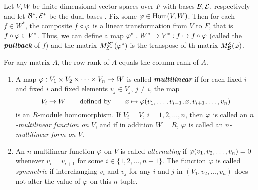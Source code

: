 \nl

\begin{thm}
Let $V,W$ be finite dimensional vector spaces over $F$ with bases $\mathcal{B}, \mathcal{E}$, respectively and let $\mathcal{B}^*,\mathcal{E}^*$ be the dual bases . Fix some $\varphi\in \text{Hom}(V,W)$. Then for each $f\in W^*$, the composite $f\circ \varphi$ is a linear transformation from $V$ to $F$, that is $f\circ \varphi\in V^*$. Thus, we can define a map $\varphi^*:W^* \rightarrow V^*:f\mapsto f\circ \varphi$ (called the \textit{\textbf{pullback}} of $f$) and the matrix $M_{\mathcal{E}^*}^{\mathcal{B}^*}(\varphi^*)$ is the transpose of th matrix $M_{\mathcal{B}}^{\mathcal{E}}(\varphi)$.
\end{thm}

\nl

\begin{cor}
For any matrix $A$, the row rank of $A$ equals the column rank of $A$.
\end{cor}

\nl

\begin{defn}\nl
\begin{enumerate}
\item A map $\varphi:V_1\times V_2\times \cdots \times V_n\rightarrow W$ is called \textit{\textbf{multilinear}} if for each fixed $i$ and fixed $i$ and fixed elements $v_j\in V_j$, $j\neq i$, the map
\[V_i \rightarrow W\qquad \text{defined by}\qquad x\mapsto \varphi(v_1,\ldots,v_{i-1},x,v_{i+1},\ldots, v_n)\]
is an $R$-module homomorphism. If $V_i = V$, $i = 1,2,\ldots, n$, then $\varphi$ is called an $n$\textit{-multilinear function on $V$}, and if in addition $W = R$, $\varphi$ is called an \textit{$n$-multilinear form on $V$}.

\item An $n$-multilinear function $\varphi$ on $V$ is called \textit{alternating} if $\varphi(v_1, v_2,\ldots, v_n) = 0$ whenever $v_i = v_{i + 1}$ for some $i\in \{1,2,\ldots, n-1\}$. The function $\varphi$ is called \textit{symmetric} if interchanging $v_i$ and $v_j$ for any $i$ and $j$ in $(V_1,v_2,\ldots, v_n)$ does not alter the value of $\varphi$ on this $n$-tuple.
\end{enumerate}
\end{defn}

\nl

